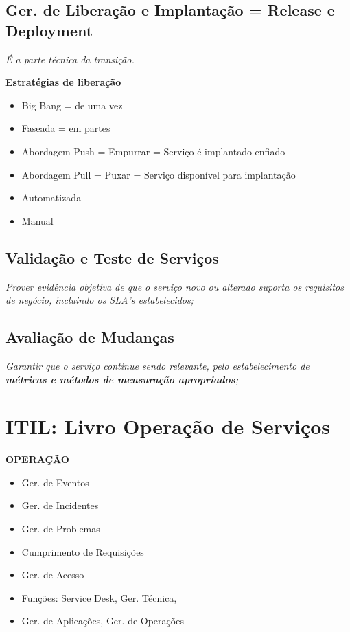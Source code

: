 \subsection{Ger. de Liberação e Implantação = Release e Deployment}

\begin{center}
	\emph{É a parte técnica da transição.}
\end{center}


\textbf{Estratégias de liberação}
\begin{itemize}
	\item Big Bang = de uma vez
	\item Faseada = em partes
	\item Abordagem Push = Empurrar = Serviço é implantado enfiado
	\item Abordagem Pull = Puxar = Serviço disponível para implantação
	\item Automatizada
	\item Manual
\end{itemize}

\subsection{Validação e Teste de Serviços}

\begin{center}
	\emph{Prover evidência objetiva de que o serviço novo ou alterado suporta os requisitos de negócio, incluindo os SLA’s estabelecidos;}
\end{center}

\subsection{Avaliação de Mudanças}
	\begin{center}
		\emph{Garantir que o serviço continue sendo relevante, pelo estabelecimento de \textbf{métricas e métodos de mensuração apropriados};}
	\end{center}



\section{ITIL: Livro Operação de Serviços}

\textbf{OPERAÇÃO}
\begin{itemize}
	\item Ger. de Eventos
	\item Ger. de Incidentes
	\item Ger. de Problemas
	\item Cumprimento de Requisições
	\item Ger. de Acesso
	\item Funções: Service Desk, Ger. Técnica,
	\item Ger. de Aplicações, Ger. de Operações
\end{itemize}


